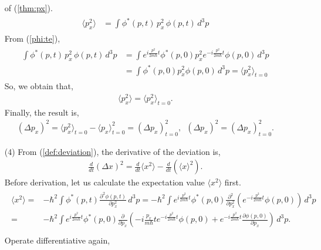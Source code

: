 \documentclass[floatfix,nofootinbib,superscriptaddress,fleqn]{revtex4-2}
\begin{document}
\begin{itemize}
  of (\ref{thm:px}).
  \begin{align*}
    \begin{split}
      \langle p_x^2 \rangle &= \int \phi^*(p,t)\,p^2_x\,\phi(p,t)\,d^3p
    \end{split}
  \end{align*}
  From (\ref{phi:te}),
  \begin{align*}
    \begin{split}
      \int \phi^*(p,t)\,p^2_x\,\phi(p,t)\,d^3p
      &=\int e^{i\frac{p^2}{2m\hbar}t}\phi^*(p,0)p^2_x 
      e^{-i\frac{p^2}{2m\hbar}t}\phi(p,0)\,d^3p  \\
      &=\int\phi^*(p,0)p^2_x\phi(p,0)\,d^3p =\langle p^2_x \rangle_{t=0}
    \end{split}      
  \end{align*}
  So, we obtain that,
  \begin{align}
    \langle p_x^2 \rangle=\langle p_x^2 \rangle_{t=0}.
  \end{align}
Finally, the result is,
\begin{align}
  (\Delta p_x)^2 = \langle p_x^2\rangle_{t=0}
  -\langle p_x \rangle^2_{t=0}
  =(\Delta p_x)^2_{t=0}, 
  \,\,\, (\Delta p_x)^2=(\Delta p_x)^2_{t=0}. 
\end{align}
  \item[(4)] From (\ref{def:deviation}), the derivative of the deviation is,
  \begin{align}
    \frac{d}{dt}(\Delta x)^2=\frac{d}{dt}\langle x^2\rangle
    -\frac{d}{dt}\left(\langle x \rangle^2\right). 
  \end{align}
  Before derivation, let us calculate the expectation value 
  $\langle x^2 \rangle$ first.
  \begin{align*}
    \begin{split}  
      \langle x^2 \rangle =& -\hbar^2\int\phi^*(p,t)
      \frac{\partial^2\phi(p,t)}{\partial p_x^2}\,d^3p
      =  -\hbar^2\int e^{i\frac{p^2}{2m\hbar}t}\phi^*(p,0)
      \frac{\partial^2}{\partial p_x^2}
      \left(e^{-i\frac{p^2}{2m\hbar}t}\phi(p,0)\right)\,d^3p  \\
      =& -\hbar^2\int e^{i\frac{p^2}{2m\hbar}t}\phi^*(p,0)
      \frac{\partial}{\partial p_x}
      \left(-i\frac{p_x}{m\hbar}te^{-i\frac{p^2}{2m\hbar}t}\phi(p,0)
      +e^{-i\frac{p^2}{2m\hbar}t}
      \frac{\partial\phi(p,0)}{\partial p_x}\right)\,d^3p . \\
    \end{split}
  \end{align*}
  Operate differentiative again,

\end{itemize}
\end{document}
